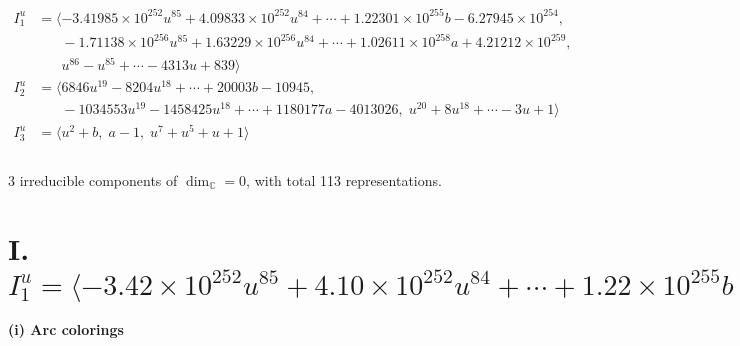 \documentclass[1p]{elsarticle_modified}
\theoremstyle{definition}
\begin{document}
\begin{align*}
I^u_{1}&=\langle 
-3.41985\times10^{252} u^{85}+4.09833\times10^{252} u^{84}+\cdots+1.22301\times10^{255} b-6.27945\times10^{254},\\
\phantom{I^u_{1}}&\phantom{= \langle  }-1.71138\times10^{256} u^{85}+1.63229\times10^{256} u^{84}+\cdots+1.02611\times10^{258} a+4.21212\times10^{259},\\
\phantom{I^u_{1}}&\phantom{= \langle  }u^{86}- u^{85}+\cdots-4313 u+839\rangle \\
I^u_{2}&=\langle 
6846 u^{19}-8204 u^{18}+\cdots+20003 b-10945,\\
\phantom{I^u_{2}}&\phantom{= \langle  }-1034553 u^{19}-1458425 u^{18}+\cdots+1180177 a-4013026,\;u^{20}+8 u^{18}+\cdots-3 u+1\rangle \\
I^u_{3}&=\langle 
u^2+b,\;a-1,\;u^7+u^5+u+1\rangle \\
\\
\end{align*}
\raggedright * 3 irreducible components of $\dim_{\mathbb{C}}=0$, with total 113 representations.\\
\newpage
\renewcommand{\arraystretch}{1}
\centering \section*{I. $I^u_{1}= \langle -3.42\times10^{252} u^{85}+4.10\times10^{252} u^{84}+\cdots+1.22\times10^{255} b-6.28\times10^{254},\;-1.71\times10^{256} u^{85}+1.63\times10^{256} u^{84}+\cdots+1.03\times10^{258} a+4.21\times10^{259},\;u^{86}- u^{85}+\cdots-4313 u+839 \rangle$}
\flushleft \textbf{(i) Arc colorings}\\
\end{document}
